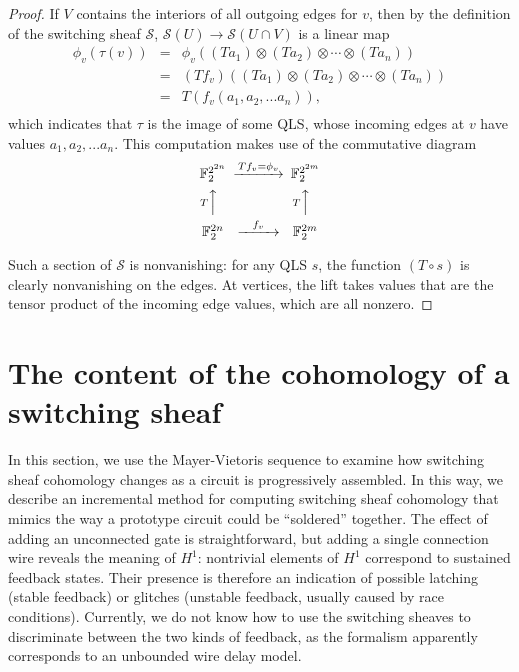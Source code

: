 \documentclass{amsart}
\theoremstyle{plain}
\theoremstyle{definition}
\begin{document}
\begin{proof}
If $V$ contains the interiors of all outgoing edges for $v$, then by
the definition of the switching sheaf $\mathcal{S}$, $\mathcal{S}(U)
\to \mathcal{S}(U \cap V)$ is a linear map
\begin{eqnarray*}
\phi_v(\tau(v))&=&\phi_v((Ta_1)\otimes (Ta_2) \otimes \cdots \otimes
(Ta_n))\\
&=&(Tf_v)((Ta_1)\otimes (Ta_2) \otimes \cdots \otimes
(Ta_n))\\
&=&T(f_v(a_1,a_2,... a_n)),\\
\end{eqnarray*}
which indicates that $\tau$ is the image of some QLS, whose incoming
edges at $v$ have values $a_1,a_2,... a_n$.  This computation makes use
of the commutative diagram
\begin{equation*}
\begin{CD}
\mathbb{F}_2^{2^{2n}} @>Tf_v=\phi_v>> \mathbb{F}_2^{2^{2m}}\\
@A T AA @A T AA\\
\mathbb{F}_2^{2n} @>f_v>> \mathbb{F}_2^{2m}\\
\end{CD}
\end{equation*}

Such a section of $\mathcal{S}$ is nonvanishing: for any QLS $s$, the
function $(T \circ s)$ is clearly nonvanishing on the edges.  At
vertices, the lift takes values that are the tensor product of the
incoming edge values, which are all nonzero.
\end{proof}

\section{The content of the cohomology of a switching sheaf}
\label{h1_sec}

In this section, we use the Mayer-Vietoris sequence to examine how
switching sheaf cohomology changes as a circuit is progressively
assembled.  In this way, we describe an incremental method for
computing switching sheaf cohomology that mimics the way a prototype
circuit could be ``soldered'' together.  The effect of adding an
unconnected gate is straightforward, but adding a single connection
wire reveals the meaning of $H^1$: nontrivial elements of $H^1$
correspond to sustained feedback states. Their presence is therefore
an indication of possible latching (stable feedback) or glitches
(unstable feedback, usually caused by race conditions).  Currently, we
do not know how to use the switching sheaves to discriminate
between the two kinds of feedback, as the formalism apparently corresponds to an
unbounded wire delay model.
\end{document}

